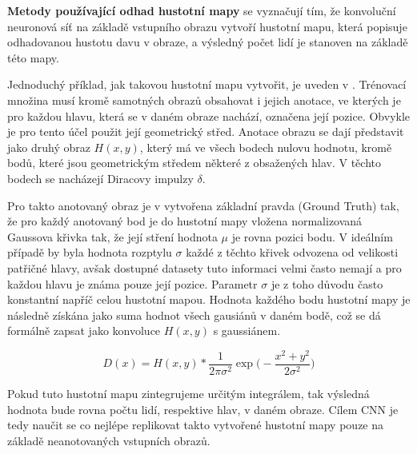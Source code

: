 \textbf{Metody používající odhad hustotní mapy} se vyznačují tím, že konvoluční neuronová síť na základě vstupního obrazu vytvoří hustotní mapu, která popisuje odhadovanou hustotu davu v obraze, a výsledný počet lidí je stanoven na základě této mapy.

Jednoduchý příklad, jak takovou hustotní mapu vytvořit, je uveden v \cite{DeepCorn, Boominathan}.
Trénovací množina musí kromě samotných obrazů obsahovat i jejich anotace, ve kterých je pro každou hlavu, která se v daném obraze nachází, označena její pozice. Obvykle je pro tento účel použit její geometrický střed.
Anotace obrazu se dají představit jako druhý obraz \(H(x, y)\), který má ve všech bodech nulovu hodnotu, kromě bodů, které jsou geometrickým středem některé z obsažených hlav. V těchto bodech se nacházejí Diracovy impulzy \(\delta\).

Pro takto anotovaný obraz je v \cite{DeepCorn, Boominathan} vytvořena základní pravda (Ground Truth) tak, že pro každý anotovaný bod je do hustotní mapy vložena normalizovaná Gaussova křivka tak, že její stření hodnota \(\mu\) je rovna pozici bodu.
V ideálním případě by byla hodnota rozptylu \(\sigma\) každé z těchto křivek odvozena od velikosti patřičné hlavy, avšak dostupné datasety tuto informaci velmi často nemají a pro každou hlavu je známa pouze její pozice.
Parametr \(\sigma\) je z toho důvodu často konstantní napříč celou hustotní mapou.
Hodnota každého bodu hustotní mapy je následně získána jako suma hodnot všech gausiánů v daném bodě, což se dá formálně zapsat jako konvoluce \(H(x, y)\) s gaussiánem.

\begin{equation}
D(x) = H(x, y) * \frac{1}{2 \pi \sigma^2} \exp{\bigg(-\frac{x^2 + y^2}{2 \sigma^2}\bigg)}
\label{eq:density_map}
\end{equation}

Pokud tuto hustotní mapu zintegrujeme určitým integrálem, tak výsledná hodnota bude rovna počtu lidí, respektive hlav, v daném obraze.
Cílem CNN je tedy naučit se co nejlépe replikovat takto vytvořené hustotní mapy pouze na základě neanotovaných vstupních obrazů.

